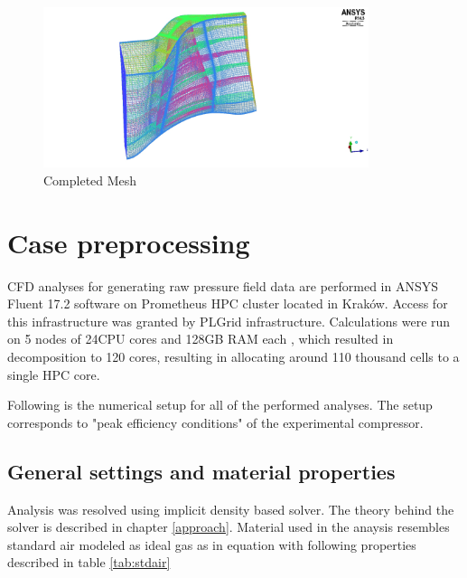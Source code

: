 \begin{figure}[h!]
\centering %
\includegraphics[width=0.85\textwidth]{Pictures/r67_ransmesh.jpg}
\caption{Completed Mesh}
\label{meshfinal}
\end{figure}

\section{Case preprocessing} \label{casepre}

CFD analyses for generating raw pressure field data are performed in ANSYS Fluent 17.2 software on Prometheus HPC cluster located in Kraków. Access for this infrastructure was granted by PLGrid infrastructure. Calculations were run on 5 nodes of 24CPU cores and 128GB RAM each \citep{prometheus}, which resulted in decomposition to 120 cores, resulting in allocating around 110 thousand cells to a single HPC core.

Following is the numerical setup for all of the performed analyses. The setup corresponds to "peak efficiency conditions" of the experimental compressor.


\subsection{General settings and material properties} \label{casegen}

Analysis was resolved using implicit density based solver. The theory behind the solver is described in chapter \ref{approach}. Material used in the anaysis resembles standard air modeled as ideal gas as in equation with following properties described in table \ref{tab:stdair} 

